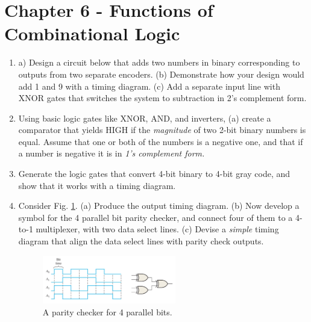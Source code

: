 \documentclass[10pt]{article}
\begin{document}
\maketitle

\section{Chapter 6 - Functions of Combinational Logic}
\label{sec:comb2}

\begin{enumerate}
\item a) Design a circuit below that adds two numbers in binary corresponding to outputs from two separate encoders. (b) Demonstrate how your design would add 1 and 9 with a timing diagram.  (c) Add a separate input line with XNOR gates that switches the system to subtraction in 2's complement form. \\ \vspace{3.5cm}
\item Using basic logic gates like XNOR, AND, and inverters, (a) create a comparator that yields HIGH if the \textit{magnitude} of two 2-bit binary numbers is equal.  Assume that one or both of the numbers is a negative one, and that if a number is negative it is in \textit{1's complement form.} \\ \vspace{3.5cm}
\item Generate the logic gates that convert 4-bit binary to 4-bit gray code, and show that it works with a timing diagram. \\ \vspace{2cm}
\item Consider Fig. \ref{fig:par}. (a) Produce the output timing diagram.  (b) Now develop a symbol for the 4 parallel bit parity checker, and connect four of them to a 4-to-1 multiplexer, with two data select lines. (c) Devise a \textit{simple} timing diagram that align the data select lines with parity check outputs.
\begin{figure}[hb]
\centering
\includegraphics[width=0.55\textwidth]{figures/parityCheck.pdf}
\caption{\label{fig:par} A parity checker for 4 parallel bits.}
\end{figure}
\end{enumerate}
\end{document}
